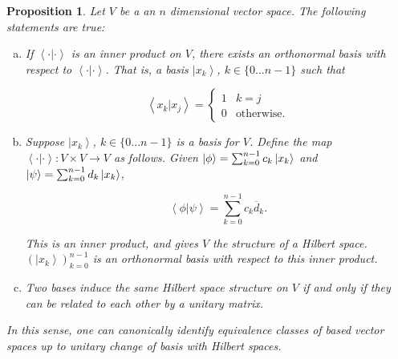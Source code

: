 \documentclass{article}
\newtheorem{proposition}{Proposition}[section]
\theoremstyle{definition}
\numberwithin{figure}{section}
\begin{document}
\begin{proposition}\label{Hilbert properties} Let $V$ be a an $n$ dimensional vector space. The following statements are true:

\begin{enumerate}[(a)]
\item If $\left<\cdot|\cdot\right>$ is an inner product on $V$, there exists an orthonormal basis with respect to $\left<\cdot|\cdot\right>$. That is, a basis $\left|x_k\right>$, $k\in \{0...n-1\}$ such that

$$\left<x_k|x_j\right>=
\begin{cases}
1 & k=j\\
0 & \text{otherwise}.
\end{cases}$$

\item Suppose $\left|x_k\right>$, $k\in \{0...n-1\}$ is a basis for $V$. Define the map $\left<\cdot|\cdot\right>:V\times V\to V$ as follows. Given $\left|\phi\right>=\sum_{k=0}^{n-1}c_k \left|x_k\right>$ and $\left|\psi\right>=\sum_{k=0}^{n-1}d_k\left|x_k\right>$,

$$\left<\phi|\psi\right>=\sum_{k=0}^{n-1}c_k\overline{d}_k.$$

This is an inner product, and gives $V$ the structure of a Hilbert space. $(\left|x_k\right>)_{k=0}^{n-1}$ is an orthonormal basis with respect to this inner product.

\item Two bases induce the same Hilbert space structure on $V$ if and only if they can be related to each other by a unitary matrix.
\end{enumerate}

In this sense, one can canonically identify equivalence classes of based vector spaces up to unitary change of basis with Hilbert spaces.
\end{proposition}
\end{document}
